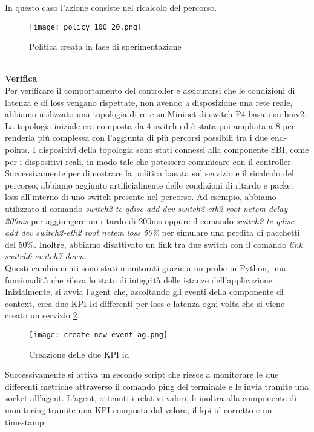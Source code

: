 In questo caso l'azione consiste nel ricalcolo del percorso.
\begin{figure}[h]
    \centering
   \texttt{[image: policy 100 20.png]}
    \caption{Politica creata in fase di sperimentazione}
    \label{fig:policy}
\end{figure}
\\\textbf{Verifica}
\\Per verificare il comportamento del controller e assicurarsi che le condizioni di latenza e di loss vengano rispettate, 
non avendo a disposizione una rete reale, abbiamo utilizzato una topologia di rete su Mininet di switch P4 basati su bmv2\cite{bmv2}.
La topologia iniziale era composta da 4 switch ed è stata poi ampliata a 8 per renderla più complessa con l'aggiunta di più percorsi possibili tra i due end-points.
I dispositivi della topologia sono stati connessi alla componente SBI, come per i dispositivi reali, in modo tale che potessero comunicare con il controller.
Successivamente per dimostrare la politica basata sul servizio e il ricalcolo del percorso, abbiamo aggiunto artificialmente delle condizioni di ritardo e packet loss all’interno di uno switch presente nel percorso. 
Ad esempio, abbiamo utilizzato il comando \textit{switch2 tc qdisc add dev switch2-eth2 root netem delay 200ms} per aggiungere un ritardo di 200ms oppure il comando \textit{switch2 tc qdisc add dev switch2-eth2 root netem loss 50\%}
 per simulare una perdita di pacchetti del 50\%. Inoltre, abbiamo disattivato un link tra due switch con il comando \textit{link switch6 switch7 down}.
\\Questi cambiamenti sono stati monitorati grazie a un probe in Python, una funzionalità che rileva lo stato di integrità delle istanze dell'applicazione.
Inizialmente, si avvia l'agent che, ascoltando gli eventi della componente di context, crea due KPI Id differenti per loss e latenza ogni volta che si viene creato un servizio \ref{fig:agent}.
\begin{figure}[h]
    \centering
   \texttt{[image: create new event ag.png]}
    \caption{Creazione delle due KPI id}
    \label{fig:agent}
\end{figure}
Successivamente si attiva un secondo script che riesce a monitorare le due differenti metriche attraverso il comando ping del terminale e le invia tramite una socket all'agent.
L'agent, ottenuti i relativi valori, li inoltra alla componente di monitoring tramite una KPI composta dal valore, il kpi id corretto e un timestamp.
